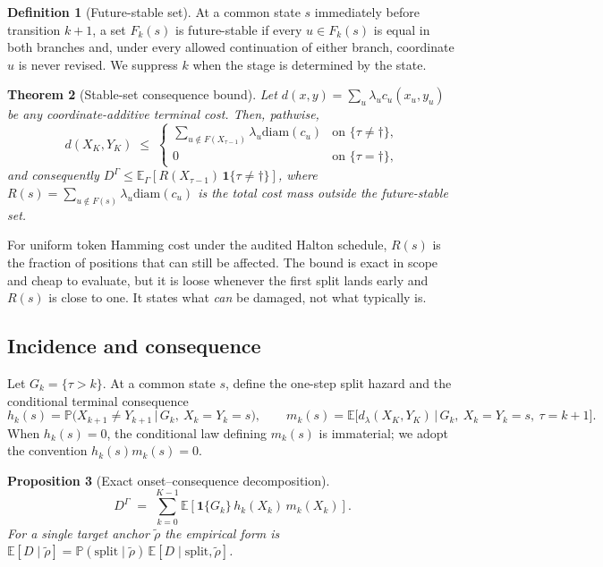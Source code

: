 \documentclass[11pt,a4paper]{article}
\theoremstyle{plain}
\newtheorem{theorem}{Theorem}[section]
\newtheorem{proposition}[theorem]{Proposition}
\theoremstyle{definition}
\newtheorem{definition}[theorem]{Definition}
\theoremstyle{remark}
\newcommand{\Ind}[1]{\mathbf{1}\{#1\}}
\newcommand{\Ex}{\mathbb{E}}
\newcommand{\Prob}{\mathbb{P}}
\newcommand{\diam}{\mathrm{diam}}
\newcommand{\rholabel}{\widetilde{\rho}}
\begin{document}
\begin{definition}[Future-stable set]
At a common state $s$ immediately before transition $k+1$, a set $F_k(s)$ is
future-stable if every $u\in F_k(s)$ is equal in both branches and, under every
allowed continuation of either branch, coordinate $u$ is never revised. We
suppress $k$ when the stage is determined by the state.
\end{definition}

\begin{theorem}[Stable-set consequence bound]
\label{thm:stableset}
Let $d(x,y) = \sum_u \lambda_u c_u(x_u,y_u)$ be any coordinate-additive terminal
cost. Then, pathwise,
\[
  d(X_K,Y_K) \;\le\;
  \begin{cases}
    \displaystyle\sum_{u \notin F(X_{\tau-1})} \lambda_u \diam(c_u)
      & \text{on } \{\tau \neq \dagger\},\\[10pt]
    0 & \text{on } \{\tau = \dagger\},
  \end{cases}
\]
and consequently
$D^\Gamma \le \Ex_\Gamma\!\left[R(X_{\tau-1})\,\Ind{\tau \neq \dagger}\right]$,
where $R(s) = \sum_{u \notin F(s)} \lambda_u \diam(c_u)$ is the total cost mass
outside the future-stable set.
\end{theorem}

For uniform token Hamming cost under the audited Halton schedule, $R(s)$ is the
fraction of positions that can still be affected. The bound is exact in scope and
cheap to evaluate, but it is loose whenever the first split lands early and $R(s)$
is close to one. It states what \emph{can} be damaged, not what typically is.

\subsection{Incidence and consequence}

Let $G_k = \{\tau > k\}$. At a common state $s$, define the one-step split hazard
and the conditional terminal consequence
\[
  h_k(s) = \Prob\big(X_{k+1} \neq Y_{k+1} \,\big|\, G_k,\ X_k = Y_k = s\big),
  \qquad
  m_k(s) = \Ex\big[d_\lambda(X_K,Y_K) \,\big|\, G_k,\ X_k = Y_k = s,\ \tau = k+1\big].
\]
When $h_k(s)=0$, the conditional law defining $m_k(s)$ is immaterial; we adopt
the convention $h_k(s)m_k(s)=0$.

\begin{proposition}[Exact onset--consequence decomposition]
\label{prop:decomp}
\[
  D^\Gamma \;=\; \sum_{k=0}^{K-1}
  \Ex\!\left[\Ind{G_k}\, h_k(X_k)\, m_k(X_k)\right].
\]
For a single target anchor $\rholabel$ the empirical form is
$\Ex[D \mid \rholabel] = \Prob(\text{split} \mid \rholabel)\,\Ex[D \mid \text{split},\rholabel]$.
\end{proposition}
\end{document}
